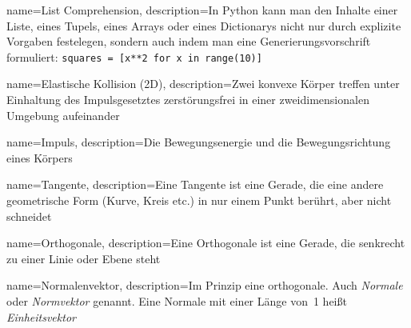 {
	name={List Comprehension},
	description={In Python kann man den Inhalte einer Liste, eines Tupels, eines Arrays oder eines Dictionarys nicht nur durch explizite Vorgaben festelegen, sondern auch indem man eine Generierungsvorschrift formuliert: \texttt{squares = [x**2 for x in range(10)]}} 
}



















{
	name={Elastische Kollision (2D)},
	description={Zwei konvexe Körper treffen unter Einhaltung des Impulsgesetztes zerstörungsfrei in einer zweidimensionalen Umgebung aufeinander} 
}

{
	name={Impuls},
	description={Die Bewegungsenergie und die Bewegungsrichtung eines Körpers} 
}

{
	name={Tangente},
	description={Eine Tangente ist eine Gerade, die eine andere geometrische Form (Kurve, Kreis etc.) in nur einem Punkt berührt, aber nicht schneidet}
}

{
	name={Orthogonale},
	description={Eine Orthogonale ist eine Gerade, die senkrecht zu einer Linie oder Ebene steht}
}

{
	name={Normalenvektor},
	description={Im Prinzip eine \gls{orthogonale}. Auch \emph{Normale} oder \emph{Normvektor} genannt. Eine Normale mit einer Länge von~1 heißt \emph{Einheitsvektor}}
}





